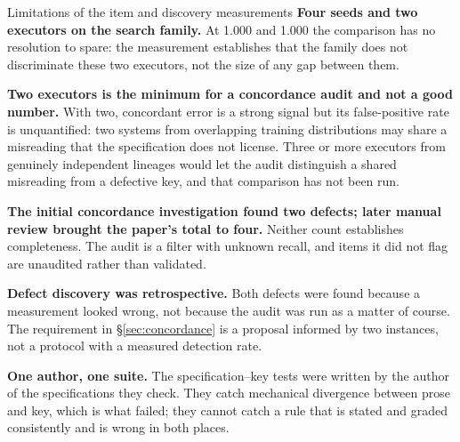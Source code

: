 \documentclass[11pt]{article}
\theoremstyle{definition}
\begin{document}
\begin{cautionbox}{Limitations of the item and discovery measurements}
\textbf{Four seeds and two executors on the search family.} At 1.000 and 1.000 the comparison has no resolution to spare: the measurement establishes that the family does not discriminate these two executors, not the size of any gap between them.

\textbf{Two executors is the minimum for a concordance audit and not a good number.} With two, concordant error is a strong signal but its false-positive rate is unquantified: two systems from overlapping training distributions may share a misreading that the specification does not license. Three or more executors from genuinely independent lineages would let the audit distinguish a shared misreading from a defective key, and that comparison has not been run.

\textbf{The initial concordance investigation found two defects; later manual review brought the paper's total to four.} Neither count establishes completeness. The audit is a filter with unknown recall, and items it did not flag are unaudited rather than validated.

\textbf{Defect discovery was retrospective.} Both defects were found because a measurement looked wrong, not because the audit was run as a matter of course. The requirement in \S\ref{sec:concordance} is a proposal informed by two instances, not a protocol with a measured detection rate.

\textbf{One author, one suite.} The specification--key tests were written by the author of the specifications they check. They catch mechanical divergence between prose and key, which is what failed; they cannot catch a rule that is stated and graded consistently and is wrong in both places.
\end{cautionbox}
\end{document}

